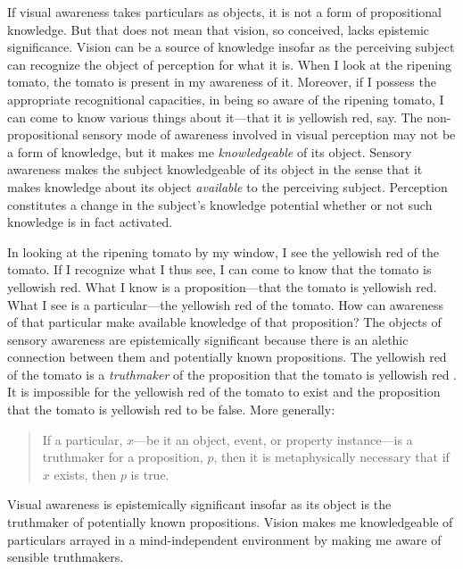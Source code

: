 \documentclass[12pt]{article}
\begin{document}
If visual awareness takes particulars as objects, it is not a form of propositional knowledge. But that does not mean that vision, so conceived, lacks epistemic significance. Vision can be a source of knowledge insofar as the perceiving subject can recognize the object of perception for what it is. When I look at the ripening tomato, the tomato is present in my awareness of it. Moreover, if I possess the appropriate recognitional capacities, in being so aware of the ripening tomato, I can come to know various things about it---that it is yellowish red, say. The non-propositional sensory mode of awareness involved in visual perception may not be a form of knowledge, but it makes me \emph{knowledgeable} of its object. Sensory awareness makes the subject knowledgeable of its object in the sense that it makes knowledge about its object \emph{available} to the perceiving subject. Perception constitutes a change in the subject's knowledge potential whether or not such knowledge is in fact activated.

In looking at the ripening tomato by my window, I see the yellowish red of the tomato. If I recognize what I thus see, I can come to know that the tomato is yellowish red. What I know is a proposition---that the tomato is yellowish red. What I see is a particular---the yellowish red of the tomato. How can awareness of that particular make available knowledge of that proposition? The objects of sensory awareness are epistemically significant because there is an alethic connection between them and potentially known propositions. The yellowish red of the tomato is a \emph{truthmaker} of the proposition that the tomato is yellowish red \citep[see][]{Johnston:2006uq}. It is impossible for the yellowish red of the tomato to exist and the proposition that the tomato is yellowish red to be false. More generally:
\begin{quote}
	If a particular, \( x \)---be it an object, event, or property instance---is a truthmaker for a proposition, \( p \), then it is metaphysically necessary that if \( x \) exists, then \( p \) is true. 
\end{quote}
Visual awareness is epistemically significant insofar as its object is the truthmaker of potentially known propositions. Vision makes me knowledgeable of particulars arrayed in a mind-independent environment by making me aware of sensible truthmakers.

\end{document}
